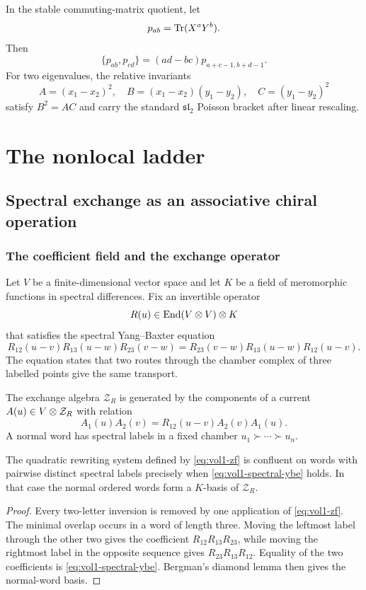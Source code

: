 In the stable commuting-matrix quotient, let
\[
 p_{ab}=\operatorname{Tr}(X^aY^b).
\]
Then
\[
 \{p_{ab},p_{cd}\}=(ad-bc)p_{a+c-1,b+d-1}.
\]
For two eigenvalues, the relative invariants
\[
 A=(x_1-x_2)^2,
 \quad B=(x_1-x_2)(y_1-y_2),
 \quad C=(y_1-y_2)^2
\]
satisfy $B^2=AC$ and carry the standard $\mathfrak{sl}_2$ Poisson bracket after linear rescaling.


\part{The nonlocal ladder}

\chapter{Spectral exchange as an associative chiral operation}
\section{The coefficient field and the exchange operator}
Let $V$ be a finite-dimensional vector space and let $K$ be a field of meromorphic functions in spectral differences.  Fix an invertible operator
\[
 R(u)\in\operatorname{End}(V\otimes V)\otimes K
\]
that satisfies the spectral Yang--Baxter equation
\begin{equation}\label{eq:vol1-spectral-ybe}
 R_{12}(u-v)R_{13}(u-w)R_{23}(v-w)
 =R_{23}(v-w)R_{13}(u-w)R_{12}(u-v).
\end{equation}
The equation states that two routes through the chamber complex of three labelled points give the same transport.

\begin{definition}
The exchange algebra $\mathcal Z_R$ is generated by the components of a current $A(u)\in V\otimes\mathcal Z_R$ with relation
\begin{equation}\label{eq:vol1-zf}
 A_1(u)A_2(v)=R_{12}(u-v)A_2(v)A_1(u).
\end{equation}
A normal word has spectral labels in a fixed chamber $u_1\succ\cdots\succ u_n$.
\end{definition}

\begin{theorem}
The quadratic rewriting system defined by \eqref{eq:vol1-zf} is confluent on words with pairwise distinct spectral labels precisely when \eqref{eq:vol1-spectral-ybe} holds.  In that case the normal ordered words form a $K$-basis of $\mathcal Z_R$.
\end{theorem}
\begin{proof}
Every two-letter inversion is removed by one application of \eqref{eq:vol1-zf}.  The minimal overlap occurs in a word of length three.  Moving the leftmost label through the other two gives the coefficient
$R_{12}R_{13}R_{23}$, while moving the rightmost label in the opposite sequence gives $R_{23}R_{13}R_{12}$.  Equality of the two coefficients is \eqref{eq:vol1-spectral-ybe}.  Bergman's diamond lemma then gives the normal-word basis.
\end{proof}

